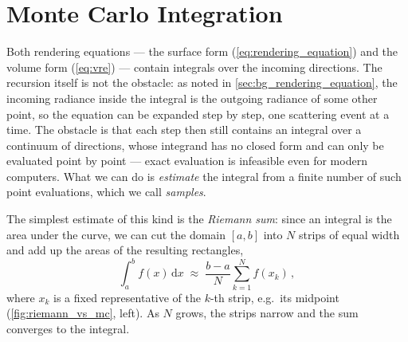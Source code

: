 \section{Monte Carlo Integration}
\label{sec:bg_monte_carlo}
Both rendering equations --- the surface form (\cref{eq:rendering_equation}) and the volume form (\cref{eq:vre}) --- contain integrals over the incoming directions. The recursion itself is not the obstacle: as noted in \cref{sec:bg_rendering_equation}, the incoming radiance inside the integral is the outgoing radiance of some other point, so the equation can be expanded step by step, one scattering event at a time. The obstacle is that each step then still contains an integral over a continuum of directions, whose integrand has no closed form and can only be evaluated point by point --- exact evaluation is infeasible even for modern computers. What we can do is \emph{estimate} the integral from a finite number of such point evaluations, which we call \emph{samples}.

The simplest estimate of this kind is the \emph{Riemann sum}: since an integral is the area under the curve, we can cut the domain $[a, b]$ into $N$ strips of equal width and add up the areas of the resulting rectangles,
\begin{equation}
	\label{eq:riemann_sum}
	\int_a^b f(x) \,\mathrm{d}x \;\approx\; \frac{b-a}{N} \sum_{k=1}^{N} f(x_k) \,,
\end{equation}
where $x_k$ is a fixed representative of the $k$-th strip, e.g.\ its midpoint (\cref{fig:riemann_vs_mc}, left). As $N$ grows, the strips narrow and the sum converges to the integral.

